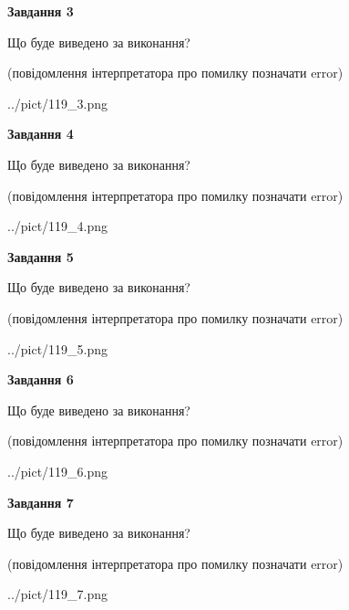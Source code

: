 \documentclass[12pt, ukrainian]{article}
\begin{document}
{\begin {large}
{\begin {center}\textbf{Завдання 3}\end {center}}\par
Що буде виведено за виконання?\par
 (повідомлення інтерпретатора про помилку позначати error)\par
\begin{center}
	{../pict/119_3.png}
\end{center}
\newpage

{\begin {center}\textbf{Завдання 4}\end {center}}\par
Що буде виведено за виконання?\par
 (повідомлення інтерпретатора про помилку позначати error)\par
\begin{center}
	{../pict/119_4.png}
\end{center}
\newpage

{\begin {center}\textbf{Завдання 5}\end {center}}\par
Що буде виведено за виконання?\par
 (повідомлення інтерпретатора про помилку позначати error)\par
\begin{center}
	{../pict/119_5.png}
\end{center}
\newpage

{\begin {center}\textbf{Завдання 6}\end {center}}\par
Що буде виведено за виконання?\par
 (повідомлення інтерпретатора про помилку позначати error)\par
\begin{center}
	{../pict/119_6.png}
\end{center}
\newpage

{\begin {center}\textbf{Завдання 7}\end {center}}\par
Що буде виведено за виконання?\par
 (повідомлення інтерпретатора про помилку позначати error)\par
\begin{center}
	{../pict/119_7.png}
\end{center}
\newpage


\end{large}}
\end{document}
